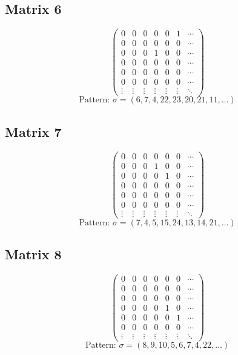 \documentclass{article}
\begin{document}
\subsection*{Matrix 6}
\[
\begin{pmatrix}
  0 & 0 & 0 & 0 & 0 & 1 & \cdots \\
  0 & 0 & 0 & 0 & 0 & 0 & \cdots \\
  0 & 0 & 0 & 1 & 0 & 0 & \cdots \\
  0 & 0 & 0 & 0 & 0 & 0 & \cdots \\
  0 & 0 & 0 & 0 & 0 & 0 & \cdots \\
  0 & 0 & 0 & 0 & 0 & 0 & \cdots \\
\vdots & \vdots & \vdots & \vdots & \vdots & \vdots & \ddots
\end{pmatrix}
\]
\[
\text{Pattern: } \sigma = (6, 7, 4, 22, 23, 20, 21, 11, \ldots)
\]
\vspace{0.5em}

\subsection*{Matrix 7}
\[
\begin{pmatrix}
  0 & 0 & 0 & 0 & 0 & 0 & \cdots \\
  0 & 0 & 0 & 1 & 0 & 0 & \cdots \\
  0 & 0 & 0 & 0 & 1 & 0 & \cdots \\
  0 & 0 & 0 & 0 & 0 & 0 & \cdots \\
  0 & 0 & 0 & 0 & 0 & 0 & \cdots \\
  0 & 0 & 0 & 0 & 0 & 0 & \cdots \\
\vdots & \vdots & \vdots & \vdots & \vdots & \vdots & \ddots
\end{pmatrix}
\]
\[
\text{Pattern: } \sigma = (7, 4, 5, 15, 24, 13, 14, 21, \ldots)
\]
\vspace{0.5em}

\subsection*{Matrix 8}
\[
\begin{pmatrix}
  0 & 0 & 0 & 0 & 0 & 0 & \cdots \\
  0 & 0 & 0 & 0 & 0 & 0 & \cdots \\
  0 & 0 & 0 & 0 & 0 & 0 & \cdots \\
  0 & 0 & 0 & 0 & 1 & 0 & \cdots \\
  0 & 0 & 0 & 0 & 0 & 1 & \cdots \\
  0 & 0 & 0 & 0 & 0 & 0 & \cdots \\
\vdots & \vdots & \vdots & \vdots & \vdots & \vdots & \ddots
\end{pmatrix}
\]
\[
\text{Pattern: } \sigma = (8, 9, 10, 5, 6, 7, 4, 22, \ldots)
\]
\vspace{0.5em}
\end{document}
